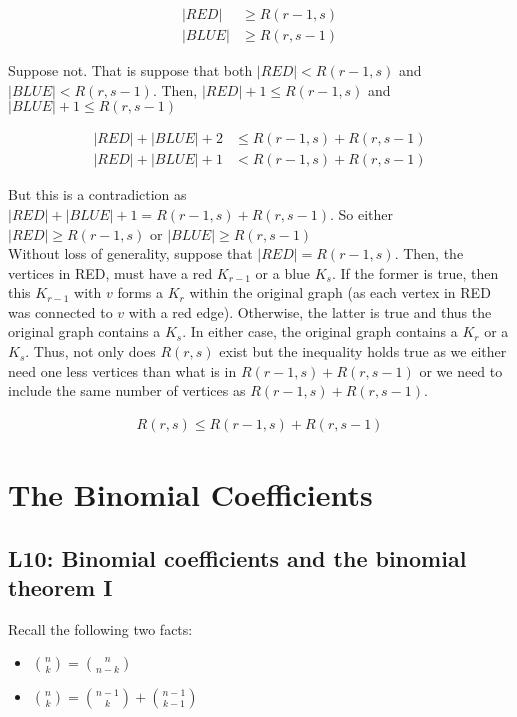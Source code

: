 \documentclass{report}
\begin{document}
\begin{subproof}
    \begin{align*}
        |RED|  & \ge R(r-1,s) \\
        |BLUE| & \ge R(r,s-1)
    \end{align*}

    Suppose not. That is suppose that both $|RED| < R(r-1,s)$ and $|BLUE| < R(r,s-1)$.
    Then, $|RED| + 1 \le R(r-1,s)$ and $|BLUE| + 1 \le R(r,s-1)$

    \begin{align*}
        |RED| + |BLUE| + 2 & \le R(r-1,s) + R(r,s-1) \\
        |RED| + |BLUE| + 1 & < R(r-1,s) + R(r,s-1)
    \end{align*}

    But this is a contradiction as $|RED| + |BLUE| + 1 = R(r-1,s) + R(r,s-1)$. So either
    $|RED| \ge R(r-1,s)$ or $|BLUE| \ge R(r,s-1)$ \\

    Without loss of generality, suppose that $|RED| = R(r-1,s)$. Then, the vertices
    in RED, must have a red $K_{r-1}$ or a blue $K_{s}$. If the former is true, then
    this $K_{r-1}$ with $v$ forms a $K_{r}$ within the original graph (as each vertex in
    RED was connected to $v$ with a red edge). Otherwise, the latter is true and thus the original
    graph contains a $K_{s}$. In either case, the original graph contains a $K_{r}$ or
    a $K_{s}$. Thus, not only does $R(r,s)$ exist but the inequality holds true as we
    either need one less vertices than what is in $R(r-1,s) + R(r,s-1)$ or we need
    to include the same number of vertices as $R(r-1,s) + R(r,s-1)$.

    \begin{align*}
        R(r,s) \le R(r-1,s) + R(r,s-1)
    \end{align*}
\end{subproof}


\chapter{The Binomial Coefficients}

\section{L10: Binomial coefficients and the binomial theorem I}

Recall the following two facts:

\begin{itemize}
    \item $\binom{n}{k} = \binom{n}{n-k}$
    \item $\binom{n}{k} = \binom{n-1}{k} + \binom{n-1}{k-1}$
\end{itemize}
\end{document}
